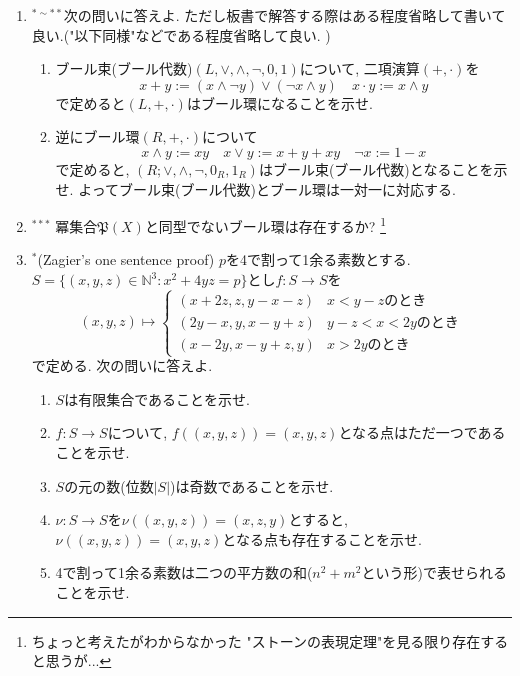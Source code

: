 \documentclass[dvipdfmx,a4paper,11pt]{article}
\theoremstyle{definition}
\begin{document}
\begin{enumerate}[label=\textbf{問}\ref*{sec-1}.\arabic*]
\item $^{* \sim **}$次の問いに答えよ. ただし板書で解答する際はある程度省略して書いて良い.("以下同様"などである程度省略して良い. )
\begin{enumerate}[label=(\arabic*).]
 \setlength{\parskip}{0cm}
  \setlength{\itemsep}{0pt}
  \item ブール束(ブール代数)$ (L, \vee, \wedge, \neg, 0, 1) $について, 二項演算$(+, \cdot)$を
  $$
 x + y := (x\wedge \neg y ) \vee (\neg x \wedge y )
 \quad
 x\cdot y :=x \wedge y
  $$
  で定めると$(L, +, \cdot)$はブール環になることを示せ. %
  \item 逆にブール環$(R, +, \cdot) $について
  $$
  x \wedge y := xy
  \quad
  x \vee y := x + y + xy
  \quad
  \neg x := 1- x
  $$
  で定めると, $ ( R; \vee, \wedge, \neg, 0_R, 1_R)$はブール束(ブール代数)となることを示せ. 
  よってブール束(ブール代数)とブール環は一対一に対応する.

  \end{enumerate}
  \item$^{***}$  冪集合$\mathfrak{P}(X)$と同型でないブール環は存在するか?
  \footnote{ちょっと考えたがわからなかった "ストーンの表現定理"を見る限り存在すると思うが... }
  
  \newpage
  
  \item $^{*}$(Zagier's one sentence proof)
  $p$を4で割って1余る素数とする. 
 $S = \{ (x, y, z) \in \mathbb{N}^3 : x^2 + 4yz = p \}$とし$f : S \to S$を
\[
(x, y, z) \mapsto 
\begin{cases}
(x + 2z, z, y - x - z) &  x < y - z \text{のとき}\\
(2y - x, y, x - y + z) & y - z < x < 2y \text{のとき}\\
(x - 2y, x - y + z, y) & x > 2y\text{のとき}
\end{cases}
\]
で定める. 次の問いに答えよ. 
\begin{enumerate}[label=(\arabic*).]
 \setlength{\parskip}{0cm}
  \setlength{\itemsep}{0pt}
  \item $S$は有限集合であることを示せ.
  \item $f :S \to S$について, $f((x,y,z))=(x,y,z)$となる点はただ一つであることを示せ.
  \item $S$の元の数(位数$|S|$)は奇数であることを示せ.
  \item $\nu : S \to S$を$\nu((x, y, z)) = (x, z, y)$とすると, $\nu((x,y,z))=(x,y,z)$となる点も存在することを示せ.
  \item 4で割って1余る素数は二つの平方数の和($n^2 + m^2$という形)で表せられることを示せ. 
  \end{enumerate}


\end{enumerate}
\end{document}
